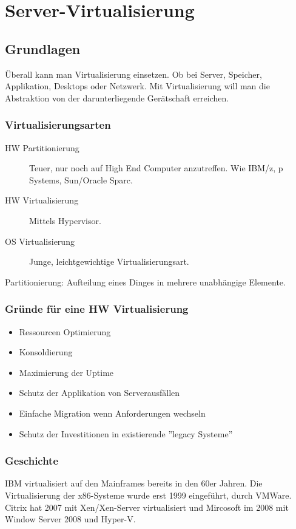 \chapter{Server-Virtualisierung}

\section{Grundlagen}
Überall kann man Virtualisierung einsetzen. Ob bei Server, Speicher, Applikation, Desktops oder Netzwerk. Mit Virtualisierung will man die Abstraktion von der darunterliegende Gerätschaft erreichen.

\subsection{Virtualisierungsarten}
\label{sec:virtualisierungsarten}
\begin{description}
	\item[HW Partitionierung] Teuer, nur noch auf High End Computer anzutreffen. Wie IBM/z, p Systems, Sun/Oracle Sparc.
	\item[HW Virtualisierung] Mittels Hypervisor.
	\item[OS Virtualisierung] Junge, leichtgewichtige Virtualisierungsart.
\end{description}
\begin{displayquote}
	Partitionierung: Aufteilung eines Dinges in mehrere unabhängige Elemente.
\end{displayquote}

\subsection{Gründe für eine HW Virtualisierung}
\label{sec:gruende-hw-virtualisierung}
\begin{itemize}
	\item Ressourcen Optimierung
	\item Konsoldierung
	\item Maximierung der Uptime
	\item Schutz der Applikation von Serverausfällen
	\item Einfache Migration wenn Anforderungen wechseln
	\item Schutz der Investitionen in existierende ''legacy Systeme'' 
\end{itemize}

\subsection{Geschichte}
IBM virtualisiert auf den Mainframes bereits in den 60er Jahren. Die Virtualisierung der x86-Systeme wurde erst 1999 eingeführt, durch VMWare. Citrix hat 2007 mit Xen/Xen-Server virtualisiert und Mircosoft im 2008 mit Window Server 2008 und Hyper-V.

